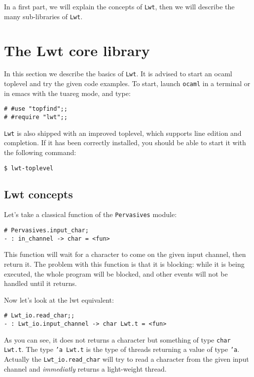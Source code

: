 In a first part, we will explain the concepts of {\tt Lwt}, then we will
describe the many sub-libraries of {\tt Lwt}.



\section{ The Lwt core library }

In this section we describe the basics of {\tt Lwt}. It is advised to
start an ocaml toplevel and try the given code examples. To start,
launch {\tt ocaml} in a terminal or in emacs with the tuareg
mode, and type:



\begin{verbatim}
# #use "topfind";;
# #require "lwt";;

\end{verbatim}

{\tt Lwt} is also shipped with an improved toplevel, which supports line
edition and completion. If it has been correctly installed, you
should be able to start it with the following command:



\begin{verbatim}
$ lwt-toplevel

\end{verbatim}

\subsection{ Lwt concepts }

Let's take a classical function of the {\tt Pervasives} module:



\lstset{language=[Objective]Caml}\begin{lstlisting}
# Pervasives.input_char;
- : in_channel -> char = <fun>

\end{lstlisting}
This function will wait for a character to come on the given input
channel, then return it. The problem with this function is that it is
blocking: while it is being executed, the whole program will be
blocked, and other events will not be handled until it returns.



Now let's look at the lwt equivalent:



\lstset{language=[Objective]Caml}\begin{lstlisting}
# Lwt_io.read_char;;
- : Lwt_io.input_channel -> char Lwt.t = <fun>

\end{lstlisting}
As you can see, it does not returns a character but something of
type {\tt char Lwt.t}. The type {\tt 'a Lwt.t} is the type
of threads returning a value of type {\tt 'a}. Actually the
{\tt Lwt\_io.read\_char} will try to read a character from the
given input channel and \emph{immediatly} returns a light-weight
thread.




